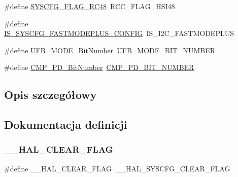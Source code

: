 \begin{DoxyCompactItemize}
\item 
\#define \hyperlink{group___h_a_l___aliased___macros_gaaf8b670b9f5fdd39553af1637189456c}{S\+Y\+S\+C\+F\+G\+\_\+\+F\+L\+A\+G\+\_\+\+R\+C48}~R\+C\+C\+\_\+\+F\+L\+A\+G\+\_\+\+H\+S\+I48
\item 
\#define \hyperlink{group___h_a_l___aliased___macros_ga57549e7341a90913bac75a34768b9562}{I\+S\+\_\+\+S\+Y\+S\+C\+F\+G\+\_\+\+F\+A\+S\+T\+M\+O\+D\+E\+P\+L\+U\+S\+\_\+\+C\+O\+N\+F\+IG}~I\+S\+\_\+\+I2\+C\+\_\+\+F\+A\+S\+T\+M\+O\+D\+E\+P\+L\+US
\item 
\#define \hyperlink{group___h_a_l___aliased___macros_gaa531b9c8535235ee73455c2b88663c03}{U\+F\+B\+\_\+\+M\+O\+D\+E\+\_\+\+Bit\+Number}~\hyperlink{group___h_a_l___private___constants_gac8a0079a8d30ec8633adaed9e2cfa49d}{U\+F\+B\+\_\+\+M\+O\+D\+E\+\_\+\+B\+I\+T\+\_\+\+N\+U\+M\+B\+ER}
\item 
\#define \hyperlink{group___h_a_l___aliased___macros_ga0ca336e48ea4840c7d1cde05a0e07e82}{C\+M\+P\+\_\+\+P\+D\+\_\+\+Bit\+Number}~\hyperlink{group___h_a_l___private___constants_ga9e34adb28e3eed088c55766f72d53183}{C\+M\+P\+\_\+\+P\+D\+\_\+\+B\+I\+T\+\_\+\+N\+U\+M\+B\+ER}
\end{DoxyCompactItemize}


\subsection{Opis szczegółowy}


\subsection{Dokumentacja definicji}
\mbox{\label{group___h_a_l___aliased___macros_ga5c6118ac714daf269dfcf8b0dc5740cf}} 
\subsubsection{\texorpdfstring{\+\_\+\+\_\+\+H\+A\+L\+\_\+\+C\+L\+E\+A\+R\+\_\+\+F\+L\+AG}{\_\_HAL\_CLEAR\_FLAG}}
{\footnotesize\ttfamily \#define \+\_\+\+\_\+\+H\+A\+L\+\_\+\+C\+L\+E\+A\+R\+\_\+\+F\+L\+AG~\+\_\+\+\_\+\+H\+A\+L\+\_\+\+S\+Y\+S\+C\+F\+G\+\_\+\+C\+L\+E\+A\+R\+\_\+\+F\+L\+AG}



